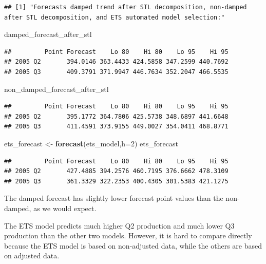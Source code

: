 \documentclass[]{book}
\newenvironment{Shaded}{\begin{snugshade}}{\end{snugshade}}
\newcommand{\DataTypeTok}[1]{\textcolor[rgb]{0.13,0.29,0.53}{#1}}
\newcommand{\DecValTok}[1]{\textcolor[rgb]{0.00,0.00,0.81}{#1}}
\newcommand{\KeywordTok}[1]{\textcolor[rgb]{0.13,0.29,0.53}{\textbf{#1}}}
\newcommand{\NormalTok}[1]{#1}
\newcommand{\StringTok}[1]{\textcolor[rgb]{0.31,0.60,0.02}{#1}}
\begin{document}
\begin{verbatim}
## [1] "Forecasts damped trend after STL decomposition, non-damped after STL decomposition, and ETS automated model selection:"
\end{verbatim}

\begin{Shaded}
\begin{Highlighting}[]
\NormalTok{damped_forecast_after_stl}
\end{Highlighting}
\end{Shaded}

\begin{verbatim}
##         Point Forecast    Lo 80    Hi 80    Lo 95    Hi 95
## 2005 Q2       394.0146 363.4433 424.5858 347.2599 440.7692
## 2005 Q3       409.3791 371.9947 446.7634 352.2047 466.5535
\end{verbatim}

\begin{Shaded}
\begin{Highlighting}[]
\NormalTok{non_damped_forecast_after_stl}
\end{Highlighting}
\end{Shaded}

\begin{verbatim}
##         Point Forecast    Lo 80    Hi 80    Lo 95    Hi 95
## 2005 Q2       395.1772 364.7806 425.5738 348.6897 441.6648
## 2005 Q3       411.4591 373.9155 449.0027 354.0411 468.8771
\end{verbatim}

\begin{Shaded}
\begin{Highlighting}[]
\NormalTok{ets_forecast <-}\StringTok{ }\KeywordTok{forecast}\NormalTok{(ets_model,}\DataTypeTok{h=}\DecValTok{2}\NormalTok{)}
\NormalTok{ets_forecast}
\end{Highlighting}
\end{Shaded}

\begin{verbatim}
##         Point Forecast    Lo 80    Hi 80    Lo 95    Hi 95
## 2005 Q2       427.4885 394.2576 460.7195 376.6662 478.3109
## 2005 Q3       361.3329 322.2353 400.4305 301.5383 421.1275
\end{verbatim}

The damped forecast has slightly lower forecast point values than the non-damped, as we would expect.

The ETS model predicts much higher Q2 production and much lower Q3 production than the other two models. However, it is hard to compare directly because the ETS model is based on non-adjusted data, while the others are based on adjusted data.
\end{document}
